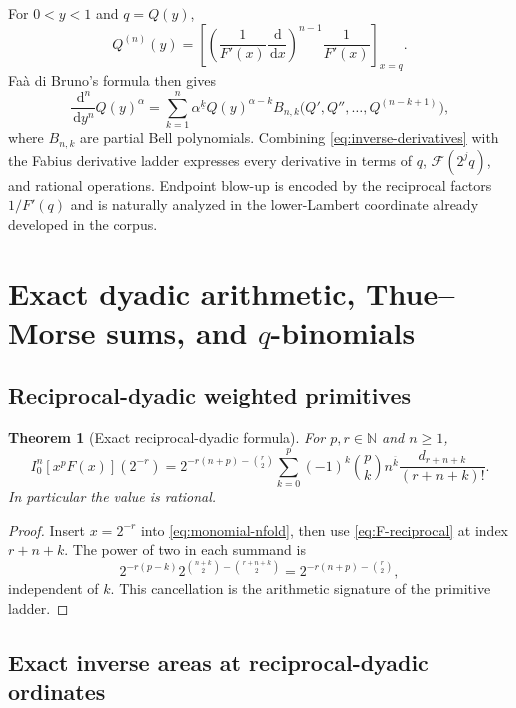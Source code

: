 \documentclass[11pt,oneside]{article}
\numberwithin{equation}{section}
\newtheorem{theorem}{Theorem}[section]
\theoremstyle{definition}
\theoremstyle{remark}
\newcommand{\N}{\mathbb N}
\newcommand{\dd}{\,\mathrm d}
\newcommand{\fall}[2]{#1^{\underline{#2}}}
\newcommand{\rise}[2]{#1^{\overline{#2}}}
\begin{document}
For $0<y<1$ and $q=Q(y)$,
\begin{equation}
 Q^{(n)}(y)=
 \left[\left(\frac1{F'(x)}\frac{\dd}{\dd x}\right)^{n-1}
 \frac1{F'(x)}\right]_{x=q}.                                 \label{eq:inverse-derivatives}
\end{equation}
Fa\`a di Bruno's formula then gives
\begin{equation}
 \frac{\dd^n}{\dd y^n}Q(y)^\alpha
 =\sum_{k=1}^n\fall\alpha kQ(y)^{\alpha-k}
 B_{n,k}\bigl(Q',Q'',\ldots,Q^{(n-k+1)}\bigr),               \label{eq:inverse-power-derivative}
\end{equation}
where $B_{n,k}$ are partial Bell polynomials.  Combining
\eqref{eq:inverse-derivatives} with the Fabius derivative ladder expresses every derivative
in terms of $q$, $\mathcal F(2^jq)$, and rational operations.  Endpoint blow-up is encoded by
the reciprocal factors $1/F'(q)$ and is naturally analyzed in the lower-Lambert coordinate
already developed in the corpus.

\section{Exact dyadic arithmetic, Thue--Morse sums, and \texorpdfstring{$q$}{q}-binomials}
\label{sec:dyadic}

\subsection{Reciprocal-dyadic weighted primitives}

\begin{theorem}[Exact reciprocal-dyadic formula]
\label{thm:dyadic-primitive}
For $p,r\in\N$ and $n\ge1$,
\begin{equation}
 \boxed{
 I_0^n[x^pF(x)](2^{-r})
 =2^{-r(n+p)-\binom r2}
 \sum_{k=0}^{p}(-1)^k\binom pk\rise nk
 \frac{d_{r+n+k}}{(r+n+k)!}.}
 \label{eq:dyadic-primitive}
\end{equation}
In particular the value is rational.
\end{theorem}

\begin{proof}
Insert $x=2^{-r}$ into \eqref{eq:monomial-nfold}, then use
\eqref{eq:F-reciprocal} at index $r+n+k$.  The power of two in each summand is
\[
 2^{-r(p-k)}2^{\binom{n+k}{2}-\binom{r+n+k}{2}}
 =2^{-r(n+p)-\binom r2},
\]
independent of $k$.  This cancellation is the arithmetic signature of the primitive ladder.
\end{proof}

\subsection{Exact inverse areas at reciprocal-dyadic ordinates}
\end{document}
